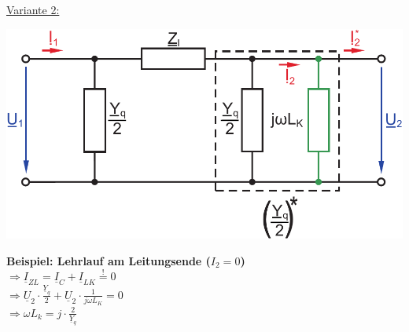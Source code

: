\documentclass[a4paper,twocolumn,10pt]{article}
\begin{document}
\underline{Variante 2:}
\begin{center}
\includegraphics[width=0.85\columnwidth]{Grafiken/Querkompensation_12}
\end{center}
\textbf{Beispiel: Lehrlauf am Leitungsende ($I_2=0$)}\\
$\Rightarrow \underline{I}_{ZL}=\underline{I}_C+\underline{I}_{LK}\overset{!}{=}0$\\
$\Rightarrow \underline{U}_2\cdot\frac{\underline{Y}_q}{2} + \underline{U}_2\cdot\frac{1}{j\omega L_K}=0$\\
$\Rightarrow \omega L_k=j\cdot\frac{2}{\underline{Y}_q}$
\end{document}
